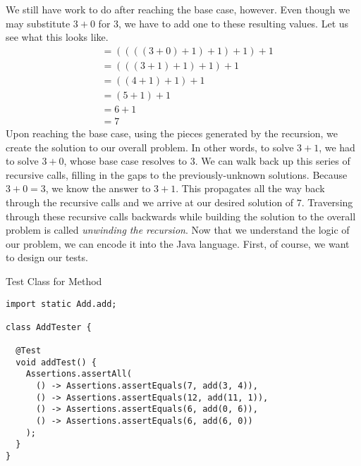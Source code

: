 We still have work to do after reaching the base case, however. Even though we may substitute $3+0$ for $3$, we have to add one to these resulting values. Let us see what this looks like.
\begin{align*}
    &= ((((3 + 0) + 1) + 1) + 1) + 1\\
    &= (((3 + 1) + 1) + 1) + 1\\
    &= ((4 + 1) + 1) + 1\\
    &= (5 + 1) + 1\\
    &= 6 + 1\\
    &= 7
\end{align*}
Upon reaching the base case, using the pieces generated by the recursion, we create the solution to our overall problem. In other words, to solve $3 + 1$, we had to solve $3 + 0$, whose base case resolves to $3$. We can walk back up this series of recursive calls, filling in the gaps to the previously-unknown solutions. Because $3 + 0 = 3$, we know the answer to $3 + 1$. This propagates all the way back through the recursive calls and we arrive at our desired solution of $7$. Traversing through these recursive calls backwards while building the solution to the overall problem is called \textit{unwinding the recursion}. Now that we understand the logic of our problem, we can encode it into the Java language. First, of course, we want to design our tests.

\begin{cl}[]{Test Class for  Method}
\begin{lstlisting}[language=MyJava]
import static Add.add;

class AddTester {
  
  @Test
  void addTest() {
    Assertions.assertAll(
      () -> Assertions.assertEquals(7, add(3, 4)),
      () -> Assertions.assertEquals(12, add(11, 1)),
      () -> Assertions.assertEquals(6, add(0, 6)),
      () -> Assertions.assertEquals(6, add(6, 0))
    );
  }
}
\end{lstlisting}
\end{cl}

